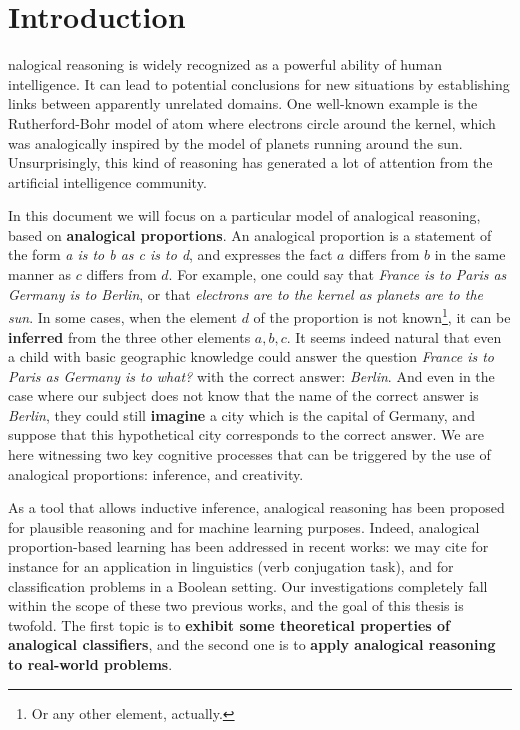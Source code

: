 \chapter*{Introduction}
nalogical reasoning is widely recognized as a powerful ability of
human intelligence.  It can lead to potential conclusions for new situations by
establishing links between apparently unrelated domains. One well-known example
is the Rutherford-Bohr model of atom where electrons circle around the kernel,
which was analogically inspired by the model of planets running around the sun.
Unsurprisingly, this kind of reasoning has generated a lot of attention from
the artificial intelligence community.

In this document we will focus on a particular model of analogical reasoning,
based on \textbf{analogical proportions}. An analogical proportion is a
statement of the form \textit{a is to b as c is to d}, and expresses the fact
$a$ differs from $b$ in the same manner as $c$ differs from $d$. For example,
one could say that \textit{France is to Paris as Germany is to Berlin}, or that
\textit{electrons are to the kernel as planets are to the sun}. In some cases,
when the element $d$ of the proportion is not known\footnote{Or any other
element, actually.}, it can be \textbf{inferred} from the three other elements
$a, b, c$. It seems indeed natural that even a child with basic geographic
knowledge could answer the question \textit{France is to Paris as Germany is to
what?} with the correct answer: \textit{Berlin}. And even in the case where our
subject does not know that the name of the correct answer is \textit{Berlin},
they could still \textbf{imagine} a city  which is the capital of Germany, and
suppose that this hypothetical city corresponds to the correct answer. We are
here witnessing two key cognitive processes that can be triggered by the use
of analogical proportions: inference, and creativity.

As a tool that allows inductive inference, analogical reasoning has been
proposed for plausible reasoning and for machine
learning purposes. Indeed, analogical proportion-based learning has been
addressed in recent works: we may cite for instance \cite{StrYvoCNLL05} for an application
in linguistics (verb conjugation task), and \cite{BayMicDelIJCAI07} for
classification problems in a Boolean setting. Our investigations completely
fall within the scope of these two previous works, and the goal of this thesis
is twofold. The first topic is to \textbf{exhibit some theoretical properties
of analogical classifiers}, and the second one is to \textbf{apply analogical
reasoning to real-world problems}.


